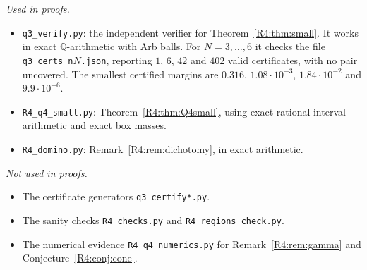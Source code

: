 \documentclass[11pt]{amsart}
\theoremstyle{definition}
\theoremstyle{remark}
\begin{document}
\emph{Used in proofs.}
\begin{itemize}
\item \texttt{q3\_\allowbreak{}verify.py}: the independent verifier for
Theorem~\ref{R4:thm:small}.  It works in exact $\mathbb Q$-arithmetic with
Arb balls.  For $N=3,\dots,6$ it checks the file
\texttt{q3\_\allowbreak{}certs\_\allowbreak{}n$N$.json}, reporting $1$, $6$, $42$ and $402$
valid certificates, with no pair uncovered.  The smallest certified margins
are $0.316$, $1.08\cdot10^{-3}$, $1.84\cdot10^{-2}$ and $9.9\cdot10^{-6}$.
\item \texttt{R4\_\allowbreak{}q4\_\allowbreak{}small.py}: Theorem~\ref{R4:thm:Q4small}, using
exact rational interval arithmetic and exact box masses.
\item \texttt{R4\_\allowbreak{}domino.py}: Remark~\ref{R4:rem:dichotomy}, in exact
arithmetic.
\end{itemize}

\emph{Not used in proofs.}
\begin{itemize}
\item The certificate generators \texttt{q3\_\allowbreak{}certify*.py}.
\item The sanity checks \texttt{R4\_\allowbreak{}checks.py} and
\texttt{R4\_\allowbreak{}regions\_\allowbreak{}check.py}.
\item The numerical evidence \texttt{R4\_\allowbreak{}q4\_\allowbreak{}numerics.py} for
Remark~\ref{R4:rem:gamma} and Conjecture~\ref{R4:conj:cone}.
\end{itemize}
\end{document}
